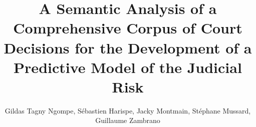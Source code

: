 \documentclass[runningheads,a4paper]{llncs}
\begin{document}
\pagestyle{empty}
\nocite{}
\mainmatter  %

\title{A Semantic Analysis of a Comprehensive Corpus of Court Decisions for the Development of a Predictive Model of the Judicial Risk 
}


%
%
\author{Gildas Tagny Ngompe, Sébastien Harispe, Jacky Montmain, Stéphane Mussard, Guillaume Zambrano}%
%
\authorrunning{
}


%
%

\maketitle
\end{document}
